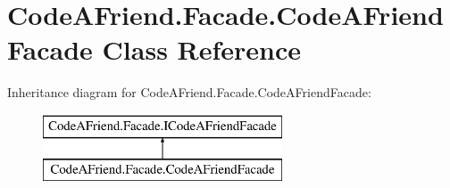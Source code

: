 \hypertarget{class_code_a_friend_1_1_facade_1_1_code_a_friend_facade}{}\section{Code\+A\+Friend.\+Facade.\+Code\+A\+Friend\+Facade Class Reference}
\label{class_code_a_friend_1_1_facade_1_1_code_a_friend_facade}


 


Inheritance diagram for Code\+A\+Friend.\+Facade.\+Code\+A\+Friend\+Facade\+:\begin{figure}[H]
\begin{center}
\leavevmode
\includegraphics[height=2.000000cm]{class_code_a_friend_1_1_facade_1_1_code_a_friend_facade}
\end{center}
\end{figure}
